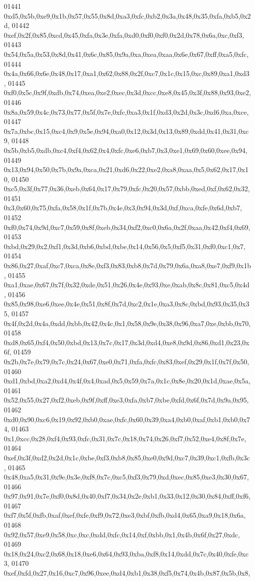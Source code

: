 \begin{DoxyCode}
01441   0xd5,0x5b,0xe9,0x1b,0x57,0x55,0x8d,0xa3,0xfc,0xb2,0x3a,0x48,0x35,0xfa,0xb5,0x2d,
01442   0xef,0x2f,0x85,0xcd,0x45,0xfa,0x3e,0xfa,0xd0,0xf0,0xf0,0x2d,0x78,0x6a,0xc,0xf3,
01443   0x54,0x5a,0x53,0x8d,0x41,0x6c,0x85,0x9a,0xa,0xea,0xaa,0x6e,0x67,0xff,0xa5,0xfc,
01444   0x4a,0x66,0x6e,0x48,0x17,0xa1,0x62,0x88,0x2f,0xc7,0x1c,0x15,0xc,0x89,0xa1,0xd3,
01445   0xf0,0x5c,0x9f,0xdb,0x74,0xea,0xe2,0xec,0x3d,0xcc,0xe8,0x45,0x3f,0x88,0x93,0xe2,
01446   0x8a,0x59,0x4c,0x73,0x77,0x5f,0x7e,0xfc,0xa3,0x1f,0xd3,0x2d,0x3c,0xd6,0xa,0xce,
01447   0x7a,0xbc,0x15,0xc4,0x9,0x5e,0x94,0xa0,0x12,0x3d,0x13,0x89,0xdd,0x41,0x31,0xc9,
01448   0x5b,0xb5,0xdb,0xc4,0xf4,0x62,0x4,0xfc,0xe6,0xb7,0x3,0xe1,0x69,0x60,0xee,0x94,
01449   0x13,0x94,0x50,0x7b,0x9a,0xca,0x21,0xd6,0x22,0xe2,0xa8,0xaa,0x5,0x62,0x17,0x10,
01450   0xc5,0x3f,0x77,0x36,0xeb,0x64,0x17,0x79,0xfc,0x20,0x57,0xbb,0xed,0xf,0x62,0x32,
01451   0x3,0x60,0x75,0xfa,0x58,0x1f,0x7b,0x4e,0x3,0x94,0x3d,0xf,0xca,0xfe,0x6d,0xb7,
01452   0xf0,0x74,0x9d,0xc7,0x59,0x8f,0xeb,0x34,0xf2,0xc0,0x6a,0x2f,0xaa,0x42,0xf4,0x69,
01453   0xbd,0x29,0x2,0xf1,0x3d,0xb6,0xbd,0xbe,0x14,0x56,0x5,0xf5,0x31,0xf0,0xc1,0x7,
01454   0x86,0x27,0xaf,0xc7,0xca,0x8e,0xf3,0x83,0xb8,0x7d,0x79,0x6a,0xa8,0xe7,0xf9,0x1b,
01455   0xa1,0xae,0x67,0x7f,0x32,0xde,0x51,0x26,0x4e,0x93,0xe,0xab,0x8c,0x81,0xc5,0x4d,
01456   0x85,0x98,0xe6,0xee,0x4e,0x51,0x8f,0x7d,0xc2,0x1e,0xa3,0x8c,0xbd,0x93,0x35,0x35,
01457   0x4f,0x2d,0x4a,0xdd,0xbb,0x42,0x4c,0x1,0x58,0x9e,0x38,0x96,0xa7,0xe,0xbb,0x70,
01458   0xd8,0x65,0xf4,0x50,0xbd,0x13,0x7c,0x17,0x3d,0xd4,0xe8,0x9d,0x86,0xd1,0x23,0x6f,
01459   0x2b,0x7e,0x79,0x7c,0x24,0x67,0xe0,0x71,0xfa,0xfc,0x83,0xef,0x29,0x1f,0x7f,0x50,
01460   0xd1,0xbd,0xa2,0xd4,0x4f,0x4,0xad,0x5,0x59,0x7a,0x1c,0x8e,0x20,0x1d,0xae,0x5a,
01461   0x52,0x55,0x27,0xf2,0xeb,0x9f,0xff,0xe3,0xfa,0xb7,0xbe,0xfd,0x6f,0x7d,0x9a,0x95,
01462   0xd0,0x90,0xc6,0x19,0x92,0xb0,0xae,0xfc,0x60,0x39,0xa4,0xb0,0xaf,0xb1,0xb0,0x74,
01463   0x1,0xcc,0x28,0xf4,0x93,0xfc,0x31,0x7c,0x18,0x74,0x26,0xf7,0x52,0xe4,0x8f,0x7e,
01464   0xef,0x3f,0xd2,0x2d,0x1c,0xbe,0xf3,0xb8,0x85,0xe0,0x9d,0xc7,0x39,0xc1,0xfb,0x3c,
01465   0x48,0xa5,0x31,0x9e,0x3e,0xf8,0x7c,0xc5,0xf3,0x79,0xd,0xec,0x85,0xe3,0x30,0x67,
01466   0x97,0x91,0x7e,0xf0,0x8d,0x40,0xf7,0x34,0x2e,0xb1,0x33,0x12,0x30,0x84,0xff,0xf6,
01467   0xf7,0x5f,0xfb,0xaf,0xef,0xfe,0xf9,0x72,0xe3,0xbf,0xfb,0xd4,0x65,0xa9,0x18,0x6a,
01468   0x92,0x57,0xe9,0x58,0xc,0xc,0xdd,0xfc,0x14,0xf,0xbb,0x1,0x4b,0x6f,0x27,0xdc,
01469   0x18,0x24,0xc2,0x68,0x18,0xe6,0x64,0x93,0xba,0xf8,0x14,0xdd,0x7c,0x40,0xfe,0xc3,
01470   0xef,0xfd,0x27,0x16,0xc7,0x96,0xee,0xd4,0xb1,0x38,0xf5,0x74,0x4b,0x87,0x5b,0x8,

\end{DoxyCode}
